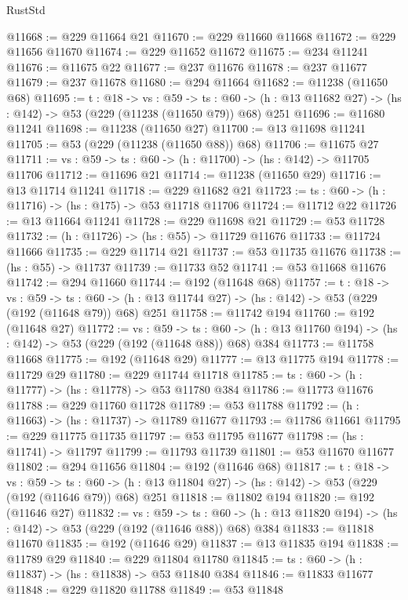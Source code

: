 \begin{lexlean}{RustStd}
\begin{coremodule}
@11668 := @229 @11664 @21
@11670 := @229 @11660 @11668
@11672 := @229 @11656 @11670
@11674 := @229 @11652 @11672
@11675 := @234 @11241
@11676 := @11675 @22
@11677 := @237 @11676
@11678 := @237 @11677
@11679 := @237 @11678
@11680 := @294 @11664
@11682 := @11238 (@11650 @68)
@11695 := {t : @18} ->
  {vs : @59} ->
  {ts : @60} -> (h : @13 @11682 @27) -> (hs : @142) -> @53 (@229 (@11238 (@11650 @79)) @68) @251
@11696 := @11680 @11241
@11698 := @11238 (@11650 @27)
@11700 := @13 @11698 @11241
@11705 := @53 (@229 (@11238 (@11650 @88)) @68)
@11706 := @11675 @27
@11711 := {vs : @59} -> {ts : @60} -> (h : @11700) -> (hs : @142) -> @11705 @11706
@11712 := @11696 @21
@11714 := @11238 (@11650 @29)
@11716 := @13 @11714 @11241
@11718 := @229 @11682 @21
@11723 := {ts : @60} -> (h : @11716) -> (hs : @175) -> @53 @11718 @11706
@11724 := @11712 @22
@11726 := @13 @11664 @11241
@11728 := @229 @11698 @21
@11729 := @53 @11728
@11732 := (h : @11726) -> (hs : @55) -> @11729 @11676
@11733 := @11724 @11666
@11735 := @229 @11714 @21
@11737 := @53 @11735 @11676
@11738 := (hs : @55) -> @11737
@11739 := @11733 @52
@11741 := @53 @11668 @11676
@11742 := @294 @11660
@11744 := @192 (@11648 @68)
@11757 := {t : @18} ->
  {vs : @59} ->
  {ts : @60} -> (h : @13 @11744 @27) -> (hs : @142) -> @53 (@229 (@192 (@11648 @79)) @68) @251
@11758 := @11742 @194
@11760 := @192 (@11648 @27)
@11772 := {vs : @59} ->
  {ts : @60} -> (h : @13 @11760 @194) -> (hs : @142) -> @53 (@229 (@192 (@11648 @88)) @68) @384
@11773 := @11758 @11668
@11775 := @192 (@11648 @29)
@11777 := @13 @11775 @194
@11778 := @11729 @29
@11780 := @229 @11744 @11718
@11785 := {ts : @60} -> (h : @11777) -> (hs : @11778) -> @53 @11780 @384
@11786 := @11773 @11676
@11788 := @229 @11760 @11728
@11789 := @53 @11788
@11792 := (h : @11663) -> (hs : @11737) -> @11789 @11677
@11793 := @11786 @11661
@11795 := @229 @11775 @11735
@11797 := @53 @11795 @11677
@11798 := (hs : @11741) -> @11797
@11799 := @11793 @11739
@11801 := @53 @11670 @11677
@11802 := @294 @11656
@11804 := @192 (@11646 @68)
@11817 := {t : @18} ->
  {vs : @59} ->
  {ts : @60} -> (h : @13 @11804 @27) -> (hs : @142) -> @53 (@229 (@192 (@11646 @79)) @68) @251
@11818 := @11802 @194
@11820 := @192 (@11646 @27)
@11832 := {vs : @59} ->
  {ts : @60} -> (h : @13 @11820 @194) -> (hs : @142) -> @53 (@229 (@192 (@11646 @88)) @68) @384
@11833 := @11818 @11670
@11835 := @192 (@11646 @29)
@11837 := @13 @11835 @194
@11838 := @11789 @29
@11840 := @229 @11804 @11780
@11845 := {ts : @60} -> (h : @11837) -> (hs : @11838) -> @53 @11840 @384
@11846 := @11833 @11677
@11848 := @229 @11820 @11788
@11849 := @53 @11848

\end{coremodule}
\end{lexlean}
